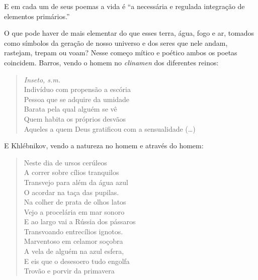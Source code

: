 E em cada um de seus poemas a vida é ``a necessária e regulada
integração de elementos primários.''

O que pode haver de mais elementar do que esses terra, água, fogo e ar,
tomados como símbolos da geração de nosso universo e dos seres que nele
andam, rastejam, trepam ou voam? Nesse começo mítico e poético ambos os
poetas coincidem. Barros, vendo o homem no \emph{clinamen} dos
diferentes reinos:

\begin{verse}
\emph{Inseto, s.m.} \\
Indivíduo com propensão a escória \\
Pessoa que se adquire da umidade \\
Barata pela qual alguém se vê \\
Quem habita os próprios desvãos \\
Aqueles a quem Deus gratificou com a \qb{}sensualidade (\ldots{})
\end{verse}

E Khlébnikov, vendo a natureza no homem e através do homem:

\begin{verse}
Neste dia de ursos cerúleos \\
A correr sobre cílios tranquilos \\
Transvejo para além da água azul \\
O acordar na taça das pupilas. \\[8pt]
Na colher de prata de olhos latos \\
Vejo a procelária em mar sonoro \\
E ao largo vai a Rússia dos pássaros \\
Transvoando entrecílios ignotos. \\[8pt]
Marventoso em celamor soçobra \\
A vela de alguém na azul esfera, \\
E eis que o desesoero tudo engolfa \\
Trovão e porvir da primavera
\end{verse}


